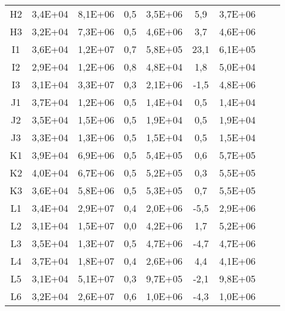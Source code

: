 \begin{center}
\begin{longtable}{ccccccccc}
    H2    & 3,4E+04 & 8,1E+06 & 0,5   & 3,5E+06 & 5,9   & 3,7E+06 \\
    H3    & 3,2E+04 & 7,3E+06 & 0,5   & 4,6E+06 & 3,7   & 4,6E+06 \\
    I1    & 3,6E+04 & 1,2E+07 & 0,7   & 5,8E+05 & 23,1  & 6,1E+05 \\
    I2    & 2,9E+04 & 1,2E+06 & 0,8   & 4,8E+04 & 1,8   & 5,0E+04 \\
    I3    & 3,1E+04 & 3,3E+07 & 0,3   & 2,1E+06 & -1,5  & 4,8E+06 \\
    J1    & 3,7E+04 & 1,2E+06 & 0,5   & 1,4E+04 & 0,5   & 1,4E+04 \\
    J2    & 3,5E+04 & 1,5E+06 & 0,5   & 1,9E+04 & 0,5   & 1,9E+04 \\
    J3    & 3,3E+04 & 1,3E+06 & 0,5   & 1,5E+04 & 0,5   & 1,5E+04 \\
    K1    & 3,9E+04 & 6,9E+06 & 0,5   & 5,4E+05 & 0,6   & 5,7E+05 \\
    K2    & 4,0E+04 & 6,7E+06 & 0,5   & 5,2E+05 & 0,3   & 5,5E+05 \\
    K3    & 3,6E+04 & 5,8E+06 & 0,5   & 5,3E+05 & 0,7   & 5,5E+05 \\
    L1    & 3,4E+04 & 2,9E+07 & 0,4   & 2,0E+06 & -5,5  & 2,9E+06 \\
    L2    & 3,1E+04 & 1,5E+07 & 0,0   & 4,2E+06 & 1,7   & 5,2E+06 \\
    L3    & 3,5E+04 & 1,3E+07 & 0,5   & 4,7E+06 & -4,7  & 4,7E+06 \\
    L4    & 3,7E+04 & 1,8E+07 & 0,4   & 2,6E+06 & 4,4   & 4,1E+06 \\
    L5    & 3,1E+04 & 5,1E+07 & 0,3   & 9,7E+05 & -2,1  & 9,8E+05 \\
    L6    & 3,2E+04 & 2,6E+07 & 0,6   & 1,0E+06 & -4,3  & 1,0E+06 \\
\end{longtable}
\end{center}


